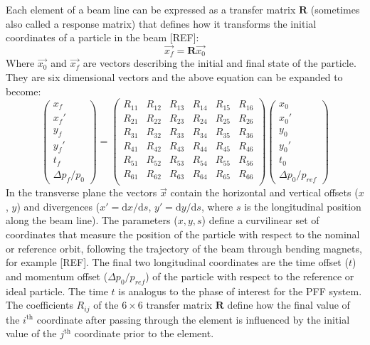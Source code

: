 Each element of a beam line can be expressed as a transfer matrix \(\mathbf{R}\) (sometimes also called a response matrix) that defines how it transforms the initial coordinates of a particle in the beam [REF]:
\begin{equation}
\vec{x_f} = \mathbf{R}\vec{x_0}
\end{equation}
Where \(\vec{x_0}\) and \(\vec{x_f}\) are vectors describing the initial and final state of the particle. They are six dimensional vectors and the above equation can be expanded to become:
\begin{equation}
\left( \begin{array}{c} x_f \\ x_f' \\ y_f \\ y_f' \\ t_f \\ \Delta p_f/p_0 \end{array} \right)
=
\left( \begin{array}{cccccc} 
R_{11} & R_{12} & R_{13} & R_{14} & R_{15} & R_{16}\\ 
R_{21} & R_{22} & R_{23} & R_{24}  & R_{25} & R_{26}\\ 
R_{31} & R_{32} & R_{33} & R_{34}  & R_{35} & R_{36}\\
R_{41} & R_{42} & R_{43} & R_{44}  & R_{45} & R_{46}\\
R_{51} & R_{52} & R_{53} & R_{54}  & R_{55} & R_{56}\\
R_{61} & R_{62} & R_{63} & R_{64}  & R_{65} & R_{66}\\
\end{array} \right)
\left( \begin{array}{c} x_0 \\ x_0' \\ y_0 \\ y_0' \\ t_0 \\ \Delta p_0/p_{ref} \end{array} \right)
\end{equation}
In the transverse plane the vectors \(\vec{x}\) contain the horizontal and vertical offsets (\(x\), \(y\)) and divergences (\(x' = \mathrm{d}x/\mathrm{d}s\), \(y' = \mathrm{d}y/\mathrm{d}s\), where \(s\) is the longitudinal position along the beam line). The parameters (\(x, y, s\)) define a curvilinear set of coordinates that measure the position of the particle with respect to the nominal or reference orbit, following the trajectory of the beam through bending magnets, for example [REF]. The final two longitudinal coordinates are the time offset (\(t\)) and momentum offset (\(\Delta p_0/p_{ref}\)) of the particle with respect to the reference or ideal particle. The time \(t\) is analogus to the phase of interest for the PFF system. The coefficients \(R_{ij}\) of the \(6\times6\) transfer matrix \(\mathbf{R}\) define how the final value of the \(i^{\mathrm{th}}\) coordinate after passing through the element is influenced by the initial value of the \(j^{\mathrm{th}}\) coordinate prior to the element.

